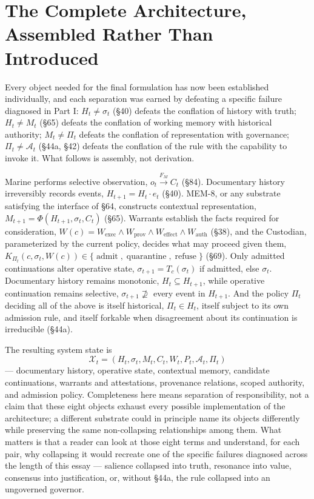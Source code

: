 \documentclass[12pt]{article}
\begin{document}
\section{The Complete Architecture, Assembled Rather Than Introduced}

Every object needed for the final formulation has now been established individually, and each separation was earned by defeating a specific failure diagnosed in Part I: $H_t\neq\sigma_t$ (\S40) defeats the conflation of history with truth; $H_t\neq M_t$ (\S65) defeats the conflation of working memory with historical authority; $M_t\neq\Pi_t$ defeats the conflation of representation with governance; $\Pi_t\neq\mathcal{A}_t$ (\S44a, \S42) defeats the conflation of the rule with the capability to invoke it. What follows is assembly, not derivation.

Marine performs selective observation, $o_t\xrightarrow{F_M}C_t$ (\S84). Documentary history irreversibly records events, $H_{t+1}=H_t\cdot e_t$ (\S40). MEM-8, or any substrate satisfying the interface of \S64, constructs contextual representation, $M_{t+1}=\Phi(H_{t+1},\sigma_t,C_t)$ (\S65). Warrants establish the facts required for consideration, $W(c)=W_{\mathrm{exec}}\land W_{\mathrm{prov}}\land W_{\mathrm{effect}}\land W_{\mathrm{auth}}$ (\S38), and the Custodian, parameterized by the current policy, decides what may proceed given them, $K_{\Pi_t}(c,\sigma_t,W(c))\in\{\operatorname{admit},\operatorname{quarantine},\operatorname{refuse}\}$ (\S69). Only admitted continuations alter operative state, $\sigma_{t+1}=T_c(\sigma_t)$ if admitted, else $\sigma_t$. Documentary history remains monotonic, $H_t\subseteq H_{t+1}$, while operative continuation remains selective, $\sigma_{t+1}\not\supseteq$ every event in $H_{t+1}$. And the policy $\Pi_t$ deciding all of the above is itself historical, $\Pi_t\in H_t$, itself subject to its own admission rule, and itself forkable when disagreement about its continuation is irreducible (\S44a).

The resulting system state is
\[
\boxed{
\mathcal{X}_t=(H_t,\sigma_t,M_t,C_t,W_t,P_t,\mathcal{A}_t,\Pi_t)
}
\]
— documentary history, operative state, contextual memory, candidate continuations, warrants and attestations, provenance relations, scoped authority, and admission policy. Completeness here means separation of responsibility, not a claim that these eight objects exhaust every possible implementation of the architecture; a different substrate could in principle name its objects differently while preserving the same non-collapsing relationships among them. What matters is that a reader can look at those eight terms and understand, for each pair, why collapsing it would recreate one of the specific failures diagnosed across the length of this essay — salience collapsed into truth, resonance into value, consensus into justification, or, without \S44a, the rule collapsed into an ungoverned governor.
\end{document}
